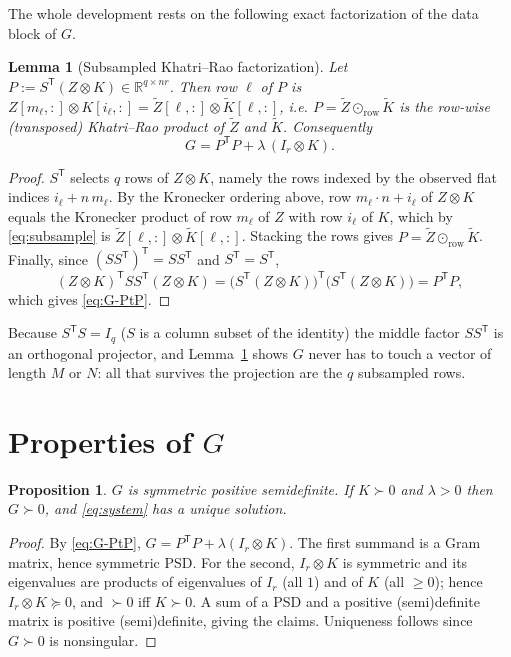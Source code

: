 \documentclass[12pt]{article}
\newcommand{\bR}{\mathbb{R}}
\newcommand{\KR}{\odot}
\newtheorem{lemma}{Lemma}
\newtheorem{proposition}{Proposition}
\begin{document}
The whole development rests on the following exact factorization of the data
block of $G$.

\begin{lemma}[Subsampled Khatri--Rao factorization]\label{lem:P}
Let $P:=S^{\mathsf T}(Z\otimes K)\in\bR^{q\times nr}$. Then row $\ell$ of $P$ is
$Z[m_\ell,:]\otimes K[i_\ell,:]=\tilde Z[\ell,:]\otimes\tilde K[\ell,:]$, i.e.
$P=\tilde Z\KR_{\mathrm{row}}\tilde K$ is the row-wise (transposed) Khatri--Rao
product of $\tilde Z$ and $\tilde K$. Consequently
\begin{equation}\label{eq:G-PtP}
  G=P^{\mathsf T}P+\lambda\,(I_r\otimes K).
\end{equation}
\end{lemma}

\begin{proof}
$S^{\mathsf T}$ selects $q$ rows of $Z\otimes K$, namely the rows indexed by the
observed flat indices $i_\ell+n\,m_\ell$. By the Kronecker ordering above,
row $m_\ell\cdot n+i_\ell$ of $Z\otimes K$ equals the Kronecker product of
row $m_\ell$ of $Z$ with row $i_\ell$ of $K$, which by \eqref{eq:subsample} is
$\tilde Z[\ell,:]\otimes\tilde K[\ell,:]$. Stacking the rows gives
$P=\tilde Z\KR_{\mathrm{row}}\tilde K$. Finally, since
$(SS^{\mathsf T})^{\mathsf T}=SS^{\mathsf T}$ and $S^{\mathsf T}=S^{\mathsf T}$,
$$(Z\otimes K)^{\mathsf T}SS^{\mathsf T}(Z\otimes K)
=\big(S^{\mathsf T}(Z\otimes K)\big)^{\mathsf T}\big(S^{\mathsf T}(Z\otimes K)\big)
=P^{\mathsf T}P,$$
which gives \eqref{eq:G-PtP}.
\end{proof}

Because $S^{\mathsf T}S=I_q$ ($S$ is a column subset of the identity) the middle
factor $SS^{\mathsf T}$ is an orthogonal projector, and Lemma~\ref{lem:P} shows
$G$ never has to touch a vector of length $M$ or $N$: all that survives the
projection are the $q$ subsampled rows.

\section{Properties of $G$}

\begin{proposition}\label{prop:spd}
$G$ is symmetric positive semidefinite. If $K\succ0$ and $\lambda>0$ then
$G\succ0$, and \eqref{eq:system} has a unique solution.
\end{proposition}

\begin{proof}
By \eqref{eq:G-PtP}, $G=P^{\mathsf T}P+\lambda(I_r\otimes K)$. The first summand
is a Gram matrix, hence symmetric PSD. For the second, $I_r\otimes K$ is
symmetric and its eigenvalues are products of eigenvalues of $I_r$ (all $1$) and
of $K$ (all $\ge0$); hence $I_r\otimes K\succeq0$, and $\succ0$ iff $K\succ0$.
A sum of a PSD and a positive (semi)definite matrix is positive (semi)definite,
giving the claims. Uniqueness follows since $G\succ0$ is nonsingular.
\end{proof}
\end{document}
